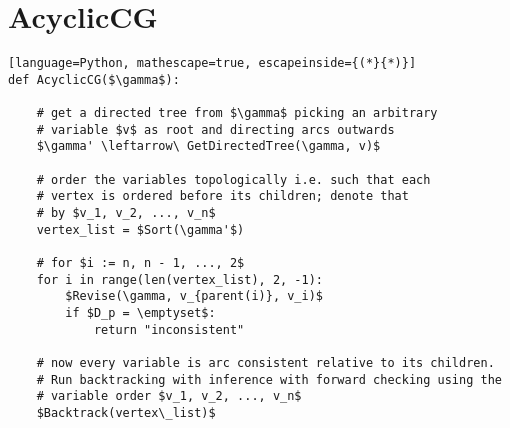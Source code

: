 \documentclass{article}
\begin{document}
\section*{AcyclicCG}
\begin{lstlisting}[language=Python, mathescape=true, escapeinside={(*}{*)}]
def AcyclicCG($\gamma$):

    # get a directed tree from $\gamma$ picking an arbitrary
    # variable $v$ as root and directing arcs outwards
    $\gamma' \leftarrow\ GetDirectedTree(\gamma, v)$

    # order the variables topologically i.e. such that each
    # vertex is ordered before its children; denote that 
    # by $v_1, v_2, ..., v_n$
    vertex_list = $Sort(\gamma'$)

    # for $i := n, n - 1, ..., 2$
    for i in range(len(vertex_list), 2, -1):
        $Revise(\gamma, v_{parent(i)}, v_i)$
        if $D_p = \emptyset$:
            return "inconsistent"

    # now every variable is arc consistent relative to its children.
    # Run backtracking with inference with forward checking using the 
    # variable order $v_1, v_2, ..., v_n$
    $Backtrack(vertex\_list)$

\end{lstlisting}
\end{document}
